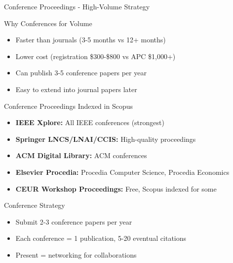 \documentclass[11pt]{beamer}
\begin{document}
	\begin{frame}{Conference Proceedings - High-Volume Strategy}
		\scriptsize
		\begin{block}{Why Conferences for Volume}
			\begin{itemize}
				\item Faster than journals (3-5 months vs 12+ months)
				\item Lower cost (registration \$300-\$800 vs APC \$1,000+)
				\item Can publish 3-5 conference papers per year
				\item Easy to extend into journal papers later
			\end{itemize}
		\end{block}
		\begin{block}{Conference Proceedings Indexed in Scopus}
			\begin{itemize}
				\item \textbf{IEEE Xplore:} All IEEE conferences (strongest)
				\item \textbf{Springer LNCS/LNAI/CCIS:} High-quality proceedings
				\item \textbf{ACM Digital Library:} ACM conferences
				\item \textbf{Elsevier Procedia:} Procedia Computer Science, Procedia Economics
				\item \textbf{CEUR Workshop Proceedings:} Free, Scopus indexed for some
			\end{itemize}
		\end{block}
		\begin{block}{Conference Strategy}
			\begin{itemize}
				\item Submit 2-3 conference papers per year
				\item Each conference = 1 publication, 5-20 eventual citations
				\item Present = networking for collaborations
			\end{itemize}
		\end{block}
	\end{frame}
	
\end{document}
